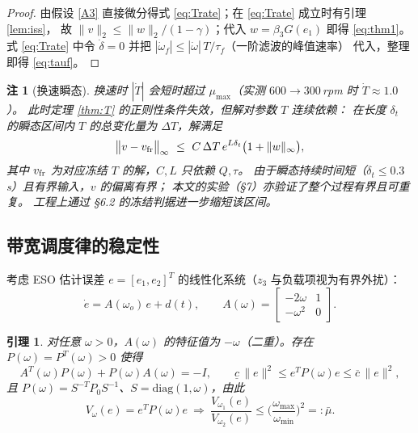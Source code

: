 \documentclass[UTF8,fontset=windows,a4paper,11pt]{ctexart}
\newtheorem{lemma}{引理}
\newtheorem{remark}{注}
\begin{document}
\begin{proof}
由假设 \ref{A3} 直接微分得式 \eqref{eq:Trate}；在 \eqref{eq:Trate} 成立时有引理 \ref{lem:iss}，
故 $\|v\|_2\le\|w\|_2/(1-\gamma)$；代入 $w=\beta_3G(e_1)$ 即得 \eqref{eq:thm1}。
式 \eqref{eq:Trate} 中令 $\dot\delta=0$ 并把 $|\dot\omega_f|\le|\dot\omega|\,T/\tau_f$（一阶滤波的峰值速率）
代入，整理即得 \eqref{eq:tauf}。
\end{proof}

\begin{remark}[换速瞬态]
换速时 $|\dot T|$ 会短时超过 $\mu_{\max}$（实测 $600\to300$\,rpm 时 $\dot T\approx1.0$）。
此时定理 \ref{thm:T} 的正则性条件失效，但解对参数 $T$ 连续依赖：
在长度 $\delta_t$ 的瞬态区间内 $T$ 的总变化量为 $\Delta T$，解满足
\begin{equation}
\big\|v-v_{\rm fr}\big\|_\infty\ \le\ C\,\Delta T\,e^{L\delta_t}\big(1+\|w\|_\infty\big),
\end{equation}
其中 $v_{\rm fr}$ 为对应冻结 $T$ 的解，$C,L$ 只依赖 $Q,\tau$。
由于瞬态持续时间短（$\delta_t\le0.3$\,s）且有界输入，$v$ 的偏离有界；
本文的实验（\S 7）亦验证了整个过程有界且可重复。
工程上通过 §6.2 的冻结判据进一步缩短该区间。
\end{remark}

\subsection{带宽调度律的稳定性}

考虑 ESO 估计误差 $e=[e_1,e_2]^{T}$ 的线性化系统（$z_3$ 与负载项视为有界外扰）：
\begin{equation}
\dot e=A(\omega_o)\,e+d(t),\qquad
A(\omega)=\begin{bmatrix}-2\omega & 1\\ -\omega^{2} & 0\end{bmatrix}.
\label{eq:esoA}
\end{equation}

\begin{lemma}\label{lem:frozen}
对任意 $\omega>0$，$A(\omega)$ 的特征值为 $-\omega$（二重）。存在
$P(\omega)=P^{T}(\omega)>0$ 使得
\begin{equation}
A^{T}(\omega)P(\omega)+P(\omega)A(\omega)=-I,\qquad
\underline{c}\,\|e\|^{2}\le e^{T}P(\omega)e\le\overline{c}\,\|e\|^{2},
\end{equation}
且 $P(\omega)=S^{-T}P_0S^{-1}$、$S=\mathrm{diag}(1,\omega)$，由此
\begin{equation}
V_{\omega}(e)=e^{T}P(\omega)e\ \Longrightarrow\
\frac{V_{\omega_1}(e)}{V_{\omega_2}(e)}\le\Big(\frac{\omega_{\max}}{\omega_{\min}}\Big)^{2}=:\bar\mu .
\label{eq:mu}
\end{equation}
\end{lemma}
\end{document}
